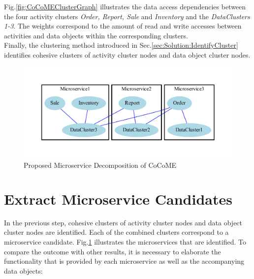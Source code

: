  Fig.\ref{fig:CoCoMEClusterGraph} illustrates the data access dependencies between the four activity clusters \textit{Order, Report, Sale} and  \textit{Inventory} and the \textit{DataClusters 1-3}. The weights correspond to the amount of read and write accesses between activities and data objects within the corresponding clusters.  \\
 Finally, the clustering method introduced in Sec.\ref{sec:Solution:IdentifyCluster} identifies cohesive clusters of activity cluster nodes and data object cluster nodes.



\begin{figure}[h!]
	\centering
	\includegraphics[width=12cm, trim={2cm 1cm 2cm 0cm}]{img/MatchClusterClustering.pdf}
	\caption{Proposed Microservice Decomposition of CoCoME}
	\label{fig:CoCoMEClusterMatching}
\end{figure}



\section{Extract Microservice Candidates}
In the previous step, cohesive clusters of activity cluster nodes and data object cluster nodes are identified. Each of the combined clusters correspond to a microservice candidate. Fig.\ref{fig:CoCoMEClusterMatching} illustrates the  microservices that are identified. To compare the outcome with other results, it is necessary to elaborate the functionality that is provided by each microservice as well as the accompanying data objects:\\


\vspace{1cm}

